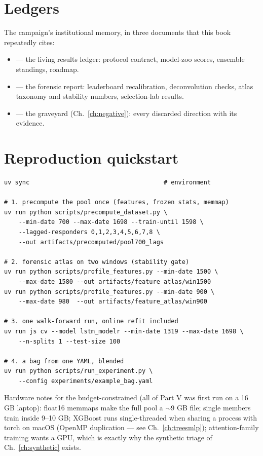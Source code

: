 \section*{Ledgers}

The campaign's institutional memory, in three documents that this book
repeatedly cites:

\begin{itemize}
\item {} --- the living results ledger:
  protocol contract, model-zoo scores, ensemble standings, roadmap.
\item {} --- the forensic report:
  leaderboard recalibration, deconvolution checks, atlas taxonomy and
  stability numbers, selection-lab results.
\item {} --- the graveyard
  (Ch.~\ref{ch:negative}): every discarded direction with its evidence.
\end{itemize}

\section*{Reproduction quickstart}

\begin{lstlisting}
uv sync                                     # environment

# 1. precompute the pool once (features, frozen stats, memmap)
uv run python scripts/precompute_dataset.py \
    --min-date 700 --max-date 1698 --train-until 1598 \
    --lagged-responders 0,1,2,3,4,5,6,7,8 \
    --out artifacts/precomputed/pool700_lags

# 2. forensic atlas on two windows (stability gate)
uv run python scripts/profile_features.py --min-date 1500 \
    --max-date 1580 --out artifacts/feature_atlas/win1500
uv run python scripts/profile_features.py --min-date 900 \
    --max-date 980  --out artifacts/feature_atlas/win900

# 3. one walk-forward run, online refit included
uv run js cv --model lstm_modelr --min-date 1319 --max-date 1698 \
    --n-splits 1 --test-size 100

# 4. a bag from one YAML, blended
uv run python scripts/run_experiment.py \
    --config experiments/example_bag.yaml
\end{lstlisting}

Hardware notes for the budget-constrained (all of Part V was first run on
a 16\,GB laptop): float16 memmaps make the full pool a $\sim$9 GB file;
single members train inside 9--10 GB; XGBoost runs single-threaded when
sharing a process with torch on macOS (OpenMP duplication --- see
Ch.~\ref{ch:treesmlp}); attention-family training wants a GPU, which is
exactly why the synthetic triage of Ch.~\ref{ch:synthetic} exists.
